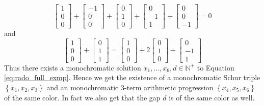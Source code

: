 \begin{example}
\begin{equation*}
		\begin{bmatrix} 1 \\ 0 \\ 0 \end{bmatrix} + \begin{bmatrix} -1 \\ 0 \\ 0 \end{bmatrix} + \begin{bmatrix} 0 \\ 1 \\ 0 \end{bmatrix} + \begin{bmatrix} 0 \\ -1 \\ 1 \end{bmatrix} + \begin{bmatrix} 0 \\ 0 \\ -1 \end{bmatrix} = 0
	\end{equation*}
	and
	\begin{equation*}
		\begin{bmatrix} 1 \\ 0 \\ 0 \end{bmatrix} + \begin{bmatrix} 0 \\ 1 \\ 1 \end{bmatrix} = \begin{bmatrix} 1 \\ 0 \\ 0 \end{bmatrix} + 2\begin{bmatrix} 0 \\ 1 \\ 0 \end{bmatrix} + \begin{bmatrix} 0 \\ -1 \\ 1 \end{bmatrix}
	\end{equation*}
	Thus there exists a monochromatic solution $x_1, \ldots, x_6, d \in \mathbb{N}^{+}$ to Equation \eqref{eq:rado_full_exmp}. Hence we get the existence of a monochromatic Schur triple $\left\{x_1, x_2, x_3\right\}$ and an monochromatic $3$-term arithmetic progression $\left\{x_4, x_5, x_6\right\}$ of the same color. In fact we also get that the gap $d$ is of the same color as well.
\end{example}
